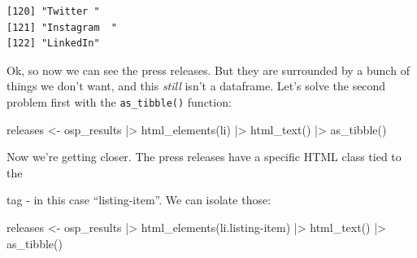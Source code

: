 \documentclass[
  letterpaper,
  DIV=11,
  numbers=noendperiod]{scrreprt}
\newenvironment{Shaded}{\begin{snugshade}}{\end{snugshade}}
\newcommand{\FunctionTok}[1]{\textcolor[rgb]{0.28,0.35,0.67}{#1}}
\newcommand{\NormalTok}[1]{\textcolor[rgb]{0.00,0.23,0.31}{#1}}
\newcommand{\OtherTok}[1]{\textcolor[rgb]{0.00,0.23,0.31}{#1}}
\newcommand{\SpecialCharTok}[1]{\textcolor[rgb]{0.37,0.37,0.37}{#1}}
\newcommand{\StringTok}[1]{\textcolor[rgb]{0.13,0.47,0.30}{#1}}
\begin{document}
\begin{verbatim}
[120] "Twitter "                                                                                                                                                                                                                                            
[121] "Instagram  "                                                                                                                                                                                                                                         
[122] "LinkedIn"                                                                                                                                                                                                                                            
\end{verbatim}

Ok, so now we can see the press releases. But they are surrounded by a
bunch of things we don't want, and this \emph{still} isn't a dataframe.
Let's solve the second problem first with the \texttt{as\_tibble()}
function:

\begin{Shaded}
\begin{Highlighting}[]
\NormalTok{releases }\OtherTok{\textless{}{-}}\NormalTok{ osp\_results }\SpecialCharTok{|\textgreater{}} \FunctionTok{html\_elements}\NormalTok{(}\StringTok{\textquotesingle{}li\textquotesingle{}}\NormalTok{) }\SpecialCharTok{|\textgreater{}} \FunctionTok{html\_text}\NormalTok{() }\SpecialCharTok{|\textgreater{}} \FunctionTok{as\_tibble}\NormalTok{()}
\end{Highlighting}
\end{Shaded}

Now we're getting closer. The press releases have a specific HTML class
tied to the

tag - in this case ``listing-item''. We can isolate those:

\begin{Shaded}
\begin{Highlighting}[]
\NormalTok{releases }\OtherTok{\textless{}{-}}\NormalTok{ osp\_results }\SpecialCharTok{|\textgreater{}} \FunctionTok{html\_elements}\NormalTok{(}\StringTok{\textquotesingle{}li.listing{-}item\textquotesingle{}}\NormalTok{) }\SpecialCharTok{|\textgreater{}} \FunctionTok{html\_text}\NormalTok{() }\SpecialCharTok{|\textgreater{}} \FunctionTok{as\_tibble}\NormalTok{()}
\end{Highlighting}
\end{Shaded}
\end{document}
